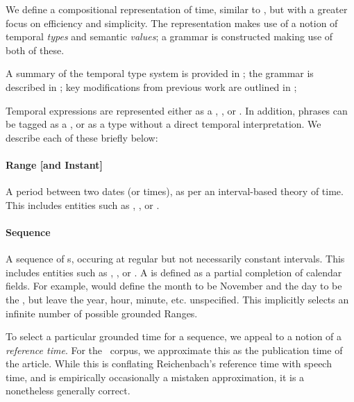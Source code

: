 We define a compositional representation of time, similar to \me, but with
  a greater focus on efficiency and simplicity.
The representation makes use of a notion of temporal \textit{types} and
  semantic \textit{values};
  a grammar is constructed making use of both of these.

A summary of the temporal type system is provided in ;
  the grammar is described in ;
  key modifications from previous work are outlined in ;

Temporal expressions are represented either as a , ,
	or .
In addition, phrases can be tagged as a , or as a  type
  without a direct temporal interpretation.
We describe each of these briefly below:

\paragraph{Range [and Instant]}
A period between two dates (or times), as per an interval-based theory of
  time\cite{key:1981allen-temporal}.
This includes entities such as , , or
	.

\paragraph{Sequence}
A sequence of s, occuring at regular but not necessarily constant
  intervals.
This includes entities such as , , or
	.
A  is defined as a partial completion of calendar fields.
For example,  would define the month to be November
  and the day to be the , but leave the year, hour, minute, etc.
  unspecified.
This implicitly selects an infinite number of possible grounded Ranges.

To select a particular grounded time for a sequence, we appeal to a notion of a
  \textit{reference time}\cite{key:1947reichenback-temporal}.
For the \tempeval\ corpus, we approximate this as the
	publication time of the article.
While this is conflating Reichenbach's reference time with speech time, 
  and is empirically occasionally a mistaken approximation,
	it is a nonetheless generally correct.

